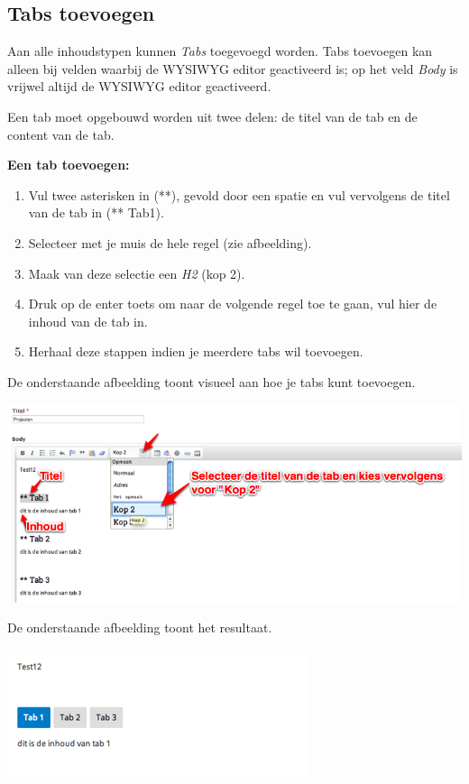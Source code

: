 \subsection{Tabs toevoegen}\label{tabstoevoegen}
Aan alle inhoudstypen kunnen \emph{Tabs} toegevoegd worden. 
Tabs toevoegen kan alleen bij velden waarbij de WYSIWYG editor geactiveerd is; op het veld \emph{Body} is vrijwel altijd de WYSIWYG editor geactiveerd.

Een tab moet opgebouwd worden uit twee delen: de titel van de tab en de content van de tab.

\textbf{Een tab toevoegen:} 

\begin{enumerate}
\item Vul twee asterisken in (**), gevold door een spatie en vul vervolgens de titel van de tab in (** Tab1).
\item Selecteer met je muis de hele regel (zie afbeelding).
\item Maak van deze selectie een \emph{H2} (kop 2).
\item Druk op de enter toets om naar de volgende regel toe te gaan, vul hier de inhoud van de tab in.
\item Herhaal deze stappen indien je meerdere tabs wil toevoegen.
\end{enumerate}

De onderstaande afbeelding toont visueel aan hoe je tabs kunt toevoegen.

\begin{center}
	\includegraphics[width=\textwidth]{img/tabs1}
\end{center}

De onderstaande afbeelding toont het resultaat.

\begin{center}
	\includegraphics[width=\textwidth]{img/tabs2}
\end{center}